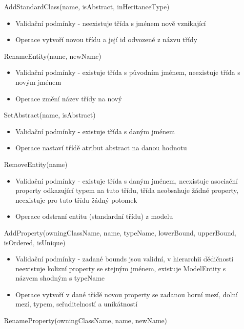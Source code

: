 \documentclass[11pt,twoside,a4paper]{book}
\begin{document}
\begin{list}{Operace :}{}
  \item AddStandardClass(name, isAbstract, inHeritanceType)
  \begin{itemize}
    \item Validační podmínky - neexistuje třída s jménem nově vznikající
    \item Operace vytvoří novou třídu a její id odvozené z názvu třídy
  \end{itemize}
  \item RenameEntity(name, newName)
  \begin{itemize}
    \item Validační podmínky - existuje třída s původním jménem, neexistuje
    třída s novým jménem
    \item Operace změní název třídy na nový
  \end{itemize}
  \item SetAbstract(name, isAbstract)
  \begin{itemize}
    \item Validační podmínky - existuje třída s daným jménem
    \item Operace nastaví třídě atribut abstract na danou hodnotu    
  \end{itemize}
  \item RemoveEntity(name)
  \begin{itemize}
    \item Validační podmínky - existuje třída s daným jménem, neexistuje
    asociační property odkazující typem na tuto třídu, třída neobsahuje žádné
    property, neexistuje pro tuto třídu žádný potomek
    \item Operace odstraní entitu (standardní třídu) z modelu
  \end{itemize}
  \item AddProperty(owningClassName, name, typeName, lowerBound, upperBound,
  isOrdered, isUnique) 
  \begin{itemize}
    \item Validační podmínky - zadané bounds jsou validní, v hierarchii
    dědičnosti neexistuje kolizní property se stejným jménem, existuje
    ModelEntity s názvem shodným s typeName
    \item  Operace vytvoří v dané třídě novou property se zadanou horní mezí,
    dolní mezí, typem, seřaditelností a unikátností
  \end{itemize}
  \item RenameProperty(owningClassName, name, newName)

\end{list}
\end{document}
